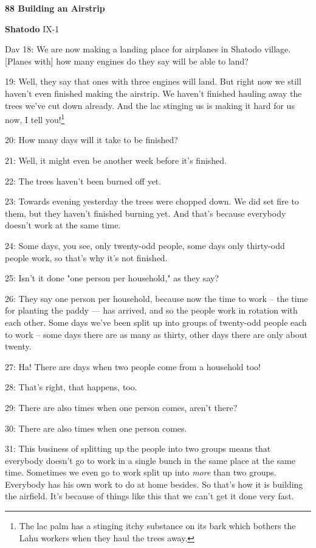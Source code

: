 
\textbf{88 Building an Airstrip }

\textbf{Shatodo} IX-1

Dav 18: We are now making a landing place for airplanes in Shatodo village. [Planes
with] how many engines do they say will be able to land?

19: Well, they say that ones with three engines will land. But right now we still
haven't even finished making the airstrip. We haven't finished hauling away the
trees we've cut down already. And the lac stinging us is making it hard for us
now, I tell you!\footnote{The lac palm has a stinging itchy substance on its bark which bothers the Lahu workers when they haul the trees away.}

20: How many days will it take to be finished?

21: Well, it might even be another week before it's finished.

22: The trees haven't been burned off yet.

23: Towards evening yesterday the trees were chopped down. We did set fire to them,
but they haven't finished burning yet. And that's because everybody doesn't work
at the same time.

24: Some days, you see, only twenty-odd people, some days only thirty-odd people
work, so that's why it's not finished.

25: Isn't it done "one person per household," as they say?

26: They say one person per household, because now the time to work -- the time
for planting the paddy --- has arrived, and so the people work in rotation with
each other. Some days we've been split up into groups of twenty-odd people each
to work -- some days there are as many as thirty, other days there are only about
twenty.

27: Ha! There are days when two people come from a household too!

28: That's right, that happens, too.

29: There are also times when one person comes, aren't there?

30: There are also times when one person comes.

31: This business of splitting up the people into two groups means that everybody
doesn't go to work in a single bunch in the same place at the same time. Sometimes
we even go to work split up into \textit{more} than two groups. Everybody has his
own work to do at home besides. So that's how it is building the airfield. It's
because of things like this that we can't get it done very fast.

